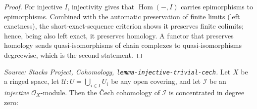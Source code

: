 \begin{proof}
  For injective \(I\), injectivity gives that \(\operatorname{Hom}(-, I)\) carries
  epimorphisms to epimorphisms. Combined with the automatic preservation of finite limits
  (left exactness), the short-exact-sequence criterion shows it preserves finite colimits;
  hence, being also left exact, it preserves homology. A functor that preserves homology
  sends quasi-isomorphisms of chain complexes to quasi-isomorphisms degreewise, which is
  the second statement.
\end{proof}

\begin{lemma}
  \label{lem:injective_cech_acyclic}
  \textit{Source: Stacks Project, Cohomology,
  \texttt{lemma-injective-trivial-cech}.}
  Let \(X\) be a ringed space, let \(\mathcal{U} : U =
  \bigcup_{i \in I} U_i\) be any open covering, and let \(\mathcal{I}\) be an
  \emph{injective} \(\mathcal{O}_X\)-module. Then the {\v C}ech cohomology of
  \(\mathcal{I}\) is concentrated in degree zero:

\end{lemma}
